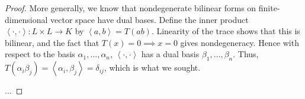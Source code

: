 \begin{proof}
	More generally, we know that nondegenerate bilinear forms on finite-dimensional vector space have dual bases. Define the inner product $\left<\cdot,\cdot\right> : L \times L \to K$ by $\left<a,b\right> = T(ab)$. Linearity of the trace shows that this is bilinear, and the fact that $T(x) = 0 \implies x = 0$ gives nondegeneracy. Hence with respect to the basis $\alpha_1,\ldots,\alpha_n$, $\left<\cdot,\cdot\right>$ has a dual basis $\beta_1,\ldots,\beta_n$. Thus, $T(\alpha_i\beta_j) = \left<\alpha_i,\beta_j\right> = \delta_{ij}$, which is what we sought.
	
	...
\end{proof}
